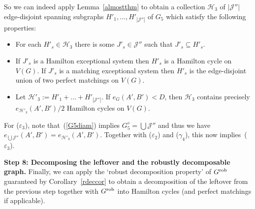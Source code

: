 \documentclass{memo-l}
\def\COMMENT#1{}
\def\eps{\varepsilon}
\def\cJ{\mathcal{J}}
\numberwithin{section}{chapter}
\numberwithin{equation}{section}
\numberwithin{firstthm}{section}
\numberwithin{figure}{section}
\begin{document}
{So we can indeed apply Lemma~\ref{almostthm} to obtain a collection $\mathcal{H}_3$ of $|\cJ''|$ edge-disjoint
spanning subgraphs $H'_1,\dots,H'_{ |\cJ''|}$ of $G_5$ which satisfy the following properties:
\begin{itemize}
\item[($\eps_1$)] For each $H'_s\in \mathcal{H}_3$ there is some $J'_s\in \mathcal{J}''$ such that $J'_s\subseteq H'_s$.
\item[($\eps_2$)] If $J'_s$ is a Hamilton exceptional system then $H'_s$ is a Hamilton cycle on $V(G)$. If
$J'_s$ is a matching exceptional system then $H'_s$ is the edge-disjoint union of two perfect matchings on $V(G)$.
\item[($\eps_3$)] Let $\mathcal{H}'_3:=H'_1+\dots+H'_{|\cJ''|}$. If $e_G(A',B') < D$, then $\mathcal{H}_3$ contains precisely
$e_{\mathcal{H}'_3}(A',B')/2$ Hamilton cycles on $V(G)$.
\end{itemize}
For ($\eps_3$), note that~(\ref{G5diam}) implies $G^{\diamond}_5 =\bigcup \cJ''$ and thus we have
$e_{ \bigcup\mathcal{J}''}(A',B')=e_{\mathcal{H}'_3}(A',B')$.
Together with ($\eps_2$) and ($\gamma_4$), this now implies~($\eps_3$).%
\COMMENT{Deryk rephrased this}
\smallskip

\noindent\textbf{Step 8: Decomposing the leftover and the robustly decomposable graph.}
Finally, we can apply the `robust decomposition property' of $G^{\rm rob}$ guaranteed by Corollary~\ref{rdeccor}
to obtain a decomposition of the leftover from the previous step together with $G^{\rm rob}$ into Hamilton cycles 
(and perfect matchings if applicable).
 
}
\end{document}
